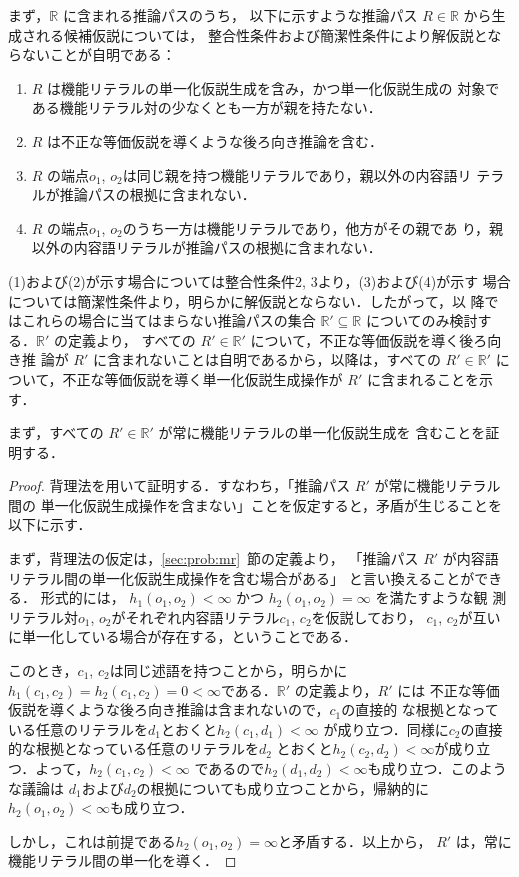 \documentclass[japanese]{jnlp_1.4}
\begin{document}
まず，$\mathbb{R}$ に含まれる推論パスのうち，
以下に示すような推論パス $R \in \mathbb{R}$ から生成される候補仮説については，
整合性条件および簡潔性条件により解仮説とならないことが自明である：
\begin{enumerate}
\item $R$ は機能リテラルの単一化仮説生成を含み，かつ単一化仮説生成の
	 対象である機能リテラル対の少なくとも一方が親を持たない．
\item $R$ は不正な等価仮説を導くような後ろ向き推論を含む．
\item $R$ の端点$o_1$, $o_2$は同じ親を持つ機能リテラルであり，親以外の内容語リ
	 テラルが推論パスの根拠に含まれない．
\item $R$ の端点$o_1$, $o_2$のうち一方は機能リテラルであり，他方がその親であ
	 り，親以外の内容語リテラルが推論パスの根拠に含まれない．
\end{enumerate}
(1)および(2)が示す場合については整合性条件2, 3より，(3)および(4)が示す
場合については簡潔性条件より，明らかに解仮説とならない．したがって，以
降ではこれらの場合に当てはまらない推論パスの集合 $\mathbb{R}'
\subseteq \mathbb{R}$ についてのみ検討する．$\mathbb{R}'$ の定義より，
すべての $R' \in \mathbb{R}'$ について，不正な等価仮説を導く後ろ向き推
論が $R'$ に含まれないことは自明であるから，以降は，すべての $R' \in
\mathbb{R}'$ について，不正な等価仮説を導く単一化仮説生成操作が $R'$
に含まれることを示す．

まず，すべての $R' \in \mathbb{R}'$ が常に機能リテラルの単一化仮説生成を
含むことを証明する．

\begin{proof}
背理法を用いて証明する．すなわち，「推論パス $R'$ が常に機能リテラル間の
単一化仮説生成操作を含まない」ことを仮定すると，矛盾が生じることを以下に示す．

まず，背理法の仮定は，\ref{sec:prob:mr}~節の定義より，
「推論パス $R'$ が内容語リテラル間の単一化仮説生成操作を含む場合がある」
と言い換えることができる．
形式的には，
$h_1(o_1,o_2) < \infty$ かつ $h_2(o_1,o_2) = \infty$ を満たすような観
測リテラル対$o_1$, $o_2$がそれぞれ内容語リテラル$c_1$, $c_2$を仮説しており，
$c_1$, $c_2$が互いに単一化している場合が存在する，ということである．

このとき，$c_1$, $c_2$は同じ述語を持つことから，明らかに$h_1(c_1,c_2) =
h_2(c_1,c_2) = 0 < \infty$である．$\mathbb{R}'$ の定義より，$R'$ には
不正な等価仮説を導くような後ろ向き推論は含まれないので，$c_1$の直接的
な根拠となっている任意のリテラルを$d_1$とおくと$h_2(c_1,d_1) < \infty$
が成り立つ．同様に$c_2$の直接的な根拠となっている任意のリテラルを$d_2$
とおくと$h_2(c_2,d_2) < \infty$が成り立つ．よって，$h_2(c_1,c_2) <
\infty$ であるので$h_2(d_1,d_2) <\infty$も成り立つ．このような議論は
$d_1$および$d_2$の根拠についても成り立つことから，帰納的に
$h_2(o_1,o_2) < \infty$も成り立つ．

しかし，これは前提である$h_2(o_1,o_2) = \infty$と矛盾する．以上から，
$R'$ は，常に機能リテラル間の単一化を導く．
\end{proof}
\end{document}
